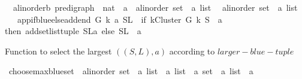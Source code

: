 \begin{isabellebody}
\ \ {\isachardoublequoteopen}{\isacharparenleft}{\kern0pt}{\isacharprime}{\kern0pt}a{\isacharcolon}{\kern0pt}{\isacharcolon}{\kern0pt}linorder{\isacharcomma}{\kern0pt}{\isacharprime}{\kern0pt}b{\isacharparenright}{\kern0pt}\ pre{\isacharunderscore}{\kern0pt}digraph\ {\isasymRightarrow}\ nat\ {\isasymRightarrow}\ {\isacharprime}{\kern0pt}a\ {\isasymRightarrow}\ {\isacharparenleft}{\kern0pt}{\isacharprime}{\kern0pt}a{\isacharcolon}{\kern0pt}{\isacharcolon}{\kern0pt}linorder\ set\ {\isasymtimes}\ {\isacharprime}{\kern0pt}a\ list{\isacharparenright}{\kern0pt}\isanewline
\ {\isasymRightarrow}\ {\isacharparenleft}{\kern0pt}{\isacharprime}{\kern0pt}a{\isacharcolon}{\kern0pt}{\isacharcolon}{\kern0pt}linorder\ set\ {\isasymtimes}\ {\isacharprime}{\kern0pt}a\ list{\isacharparenright}{\kern0pt}{\isachardoublequoteclose}\ \ \isanewline
\ \ \ {\isachardoublequoteopen}app{\isacharunderscore}{\kern0pt}if{\isacharunderscore}{\kern0pt}blue{\isacharunderscore}{\kern0pt}else{\isacharunderscore}{\kern0pt}add{\isacharunderscore}{\kern0pt}end\ G\ k\ a\ {\isacharparenleft}{\kern0pt}S{\isacharcomma}{\kern0pt}L{\isacharparenright}{\kern0pt}\ {\isacharequal}{\kern0pt}\ {\isacharparenleft}{\kern0pt}if\ {\isacharparenleft}{\kern0pt}kCluster\ G\ k\ {\isacharparenleft}{\kern0pt}S\ {\isasymunion}\ {\isacharbraceleft}{\kern0pt}a{\isacharbraceright}{\kern0pt}{\isacharparenright}{\kern0pt}{\isacharparenright}{\kern0pt}\ \isanewline
then\ add{\isacharunderscore}{\kern0pt}set{\isacharunderscore}{\kern0pt}list{\isacharunderscore}{\kern0pt}tuple\ {\isacharparenleft}{\kern0pt}{\isacharparenleft}{\kern0pt}S{\isacharcomma}{\kern0pt}L{\isacharparenright}{\kern0pt}{\isacharcomma}{\kern0pt}a{\isacharparenright}{\kern0pt}\ else\ {\isacharparenleft}{\kern0pt}S{\isacharcomma}{\kern0pt}L\ {\isacharat}{\kern0pt}\ {\isacharbrackleft}{\kern0pt}a{\isacharbrackright}{\kern0pt}{\isacharparenright}{\kern0pt}{\isacharparenright}{\kern0pt}{\isachardoublequoteclose}%
\begin{isamarkuptext}%
Function to select the largest $((S,L),a)$ according to $larger-blue-tuple$%
\end{isamarkuptext}\isamarkuptrue%
\isamarkupfalse%
\ choose{\isacharunderscore}{\kern0pt}max{\isacharunderscore}{\kern0pt}blue{\isacharunderscore}{\kern0pt}set\ {\isacharcolon}{\kern0pt}{\isacharcolon}{\kern0pt}\ {\isachardoublequoteopen}{\isacharparenleft}{\kern0pt}{\isacharparenleft}{\kern0pt}{\isacharprime}{\kern0pt}a{\isacharcolon}{\kern0pt}{\isacharcolon}{\kern0pt}linorder\ set\ {\isasymtimes}\ {\isacharprime}{\kern0pt}a\ list{\isacharparenright}{\kern0pt}\ {\isasymtimes}\ {\isacharprime}{\kern0pt}a{\isacharparenright}{\kern0pt}\ list\ {\isasymRightarrow}\ {\isacharparenleft}{\kern0pt}{\isacharparenleft}{\kern0pt}{\isacharprime}{\kern0pt}a\ set\ {\isasymtimes}\ {\isacharprime}{\kern0pt}a\ list{\isacharparenright}{\kern0pt}\ {\isasymtimes}\ {\isacharprime}{\kern0pt}a{\isacharparenright}{\kern0pt}{\isachardoublequoteclose}\isanewline

\end{isabellebody}
